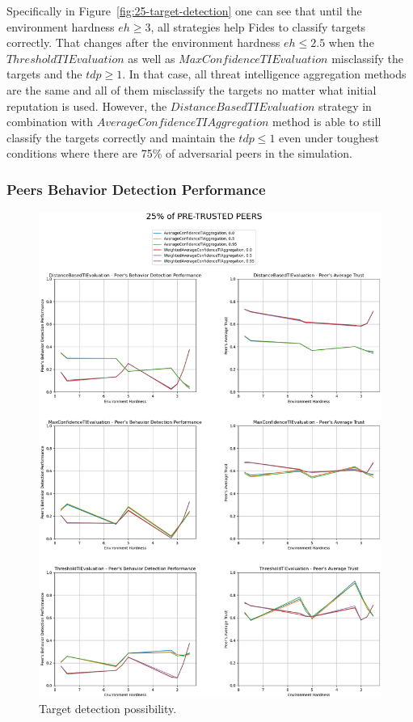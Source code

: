 Specifically in Figure~\ref{fig:25-target-detection} one can see that until the environment hardness $eh \geq 3$, all strategies help Fides to classify targets correctly.
That changes after the environment hardness $eh \leq 2.5$ when the $ThresholdTIEvaluation$ as well as $MaxConfidenceTIEvaluation$ misclassify the targets and the $tdp \geq 1$. In that case, all threat intelligence aggregation methods are the same and all of them misclassify the targets no matter what initial reputation is used.
However, the $DistanceBasedTIEvaluation$ strategy in combination with $AverageConfidenceTIAggregation$ method is able to still classify the targets correctly and maintain the $tdp \leq 1$ even under toughest conditions where there are 75\% of adversarial peers in the simulation.

\cleartoleftpage
\subsubsection{Peers Behavior Detection Performance}

\begin{figure}[hp]
    \centering
    \includegraphics[width=1.0\textwidth]{assets/25_peer_trust.png}
    \caption{Target detection possibility.}
    \label{fig:25-peer-trust}
\end{figure}

